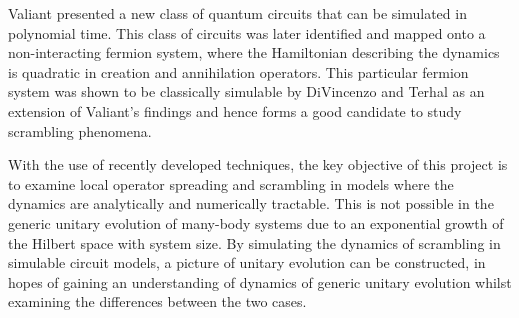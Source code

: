 Valiant \cite{Valiant2001QuantumCT} presented a new class of quantum circuits that can be simulated in
polynomial time. This class of circuits was later identified and mapped onto a non-interacting fermion system, where the Hamiltonian
describing the dynamics is quadratic in creation and annihilation operators. This particular fermion
system was shown to be classically simulable by DiVincenzo and Terhal \cite{Terhal2001} as an extension of Valiant's findings and 
hence forms a good candidate to study scrambling phenomena.

With the use of recently developed techniques, the key objective of this project is to examine local
operator spreading and scrambling in models where the dynamics are analytically and numerically tractable. This is not
possible in the generic unitary evolution of many-body systems due to an exponential growth of
the Hilbert space with system size. By simulating the dynamics of scrambling in simulable circuit models, a picture of unitary evolution
can be constructed, in hopes of gaining an understanding of dynamics of generic unitary evolution
whilst examining the differences between the two cases.




